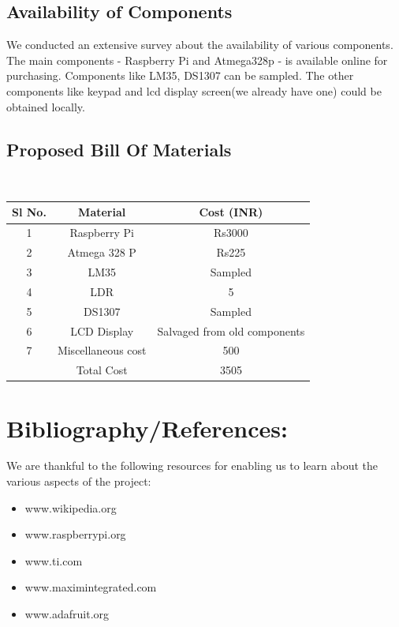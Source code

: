 \documentclass[12pt,a4paper,oneside]{report}
\begin{document}
\begin{onehalfspacing}
\section{Availability of Components}
We conducted an extensive survey about the availability of various components. The main components - Raspberry Pi and Atmega328p - is available online for purchasing. Components like LM35, DS1307 can be  sampled. The other components like keypad and lcd display screen(we already have one) could be obtained locally.


\section{Proposed Bill Of Materials}
{$\;\;\;\;$}	
\begin{table}[h]
\begin{tabular}{|c|c|c|}
\hline
\textbf{Sl No.} & \textbf{Material} & \textbf{Cost (INR)}\\
\hline
1 & Raspberry Pi & Rs3000\\
2 & Atmega 328 P & Rs225\\
3 & LM35 & Sampled\\
4 & LDR & 5\\
5 & DS1307 & Sampled\\
6 & LCD Display & Salvaged from old components\\
7 & Miscellaneous cost & 500\\
\hline
  & Total Cost & 3505\\
\hline
\end{tabular}
\end{table}


\chapter{Bibliography/References:}
We are thankful to the following resources for enabling us to learn about the various aspects of the project:
\begin{itemize}
\item www.wikipedia.org
\item www.raspberrypi.org
\item www.ti.com
\item www.maximintegrated.com
\item www.adafruit.org
\end{itemize}


\end{onehalfspacing}
\end{document}
